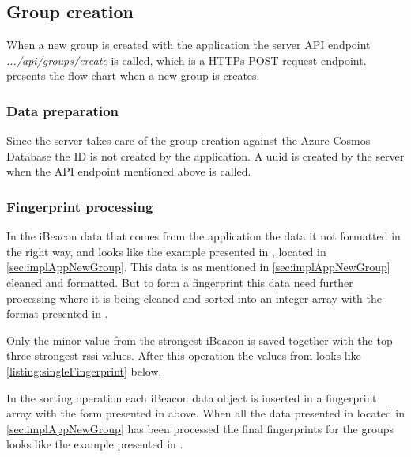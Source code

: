 \subsection{Group creation}\label{sec:implServerGroupCreation}
When a new group is created with the application the server API endpoint \textit{.../api/groups/create} is called, which is a HTTPs POST request \cite{POSTHTTPMDN} endpoint.
 presents the flow chart when a new group is creates.



\subsubsection{Data preparation}\label{sec:implServerGroupCreationDataPrep}
Since the server takes care of the group creation against the Azure Cosmos Database \cite{IntroductionAzureCosmos} the ID is not created by the application.
A \acrfull{uuid} \cite{CommonsIdUUID} is created by the server when the API endpoint mentioned above is called.


\subsubsection{Fingerprint processing}\label{sec:implServerGroupCreationFingerprint}

In the iBeacon data that comes from the application the data it not formatted in the right way, and looks like the example presented in , located in \cref{sec:implAppNewGroup}.
This data is as mentioned in \cref{sec:implAppNewGroup} cleaned and formatted.
But to form a fingerprint this data need further processing where it is being cleaned and sorted into an integer array with the format presented in .

\bigskip

Only the minor value from the strongest iBeacon is saved together with the top three strongest \acrshort{rssi} values. After this operation the values from  looks like \cref{listing:singleFingerprint} below.


In the sorting operation each iBeacon data object is inserted in a fingerprint array with the form presented in  above.
When all the data presented in  located in \cref{sec:implAppNewGroup} has been processed the final fingerprints for the groups looks like the example presented in .

